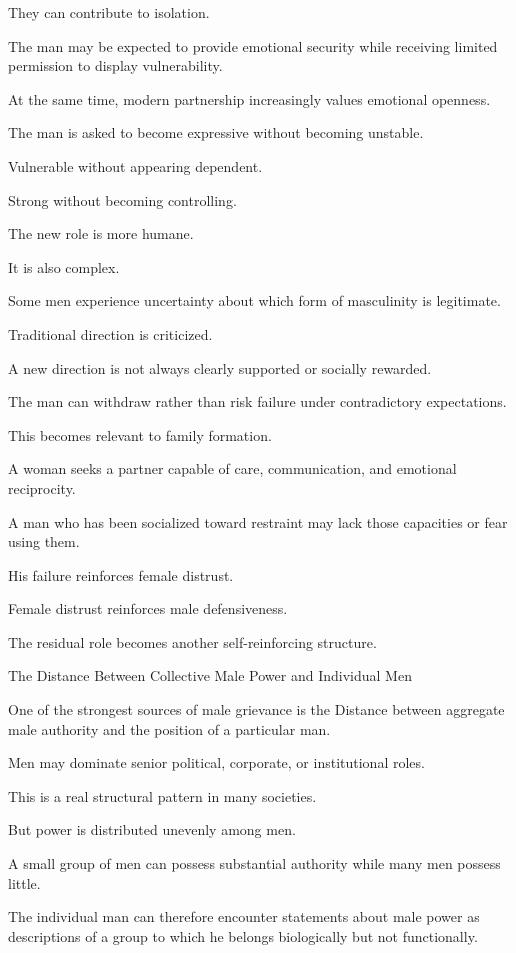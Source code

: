 They can contribute to isolation.

The man may be expected to provide emotional security while receiving limited permission to display vulnerability.

At the same time, modern partnership increasingly values emotional openness.

The man is asked to become expressive without becoming unstable.

Vulnerable without appearing dependent.

Strong without becoming controlling.

The new role is more humane.

It is also complex.

Some men experience uncertainty about which form of masculinity is legitimate.

Traditional direction is criticized.

A new direction is not always clearly supported or socially rewarded.

The man can withdraw rather than risk failure under contradictory expectations.

This becomes relevant to family formation.

A woman seeks a partner capable of care, communication, and emotional reciprocity.

A man who has been socialized toward restraint may lack those capacities or fear using them.

His failure reinforces female distrust.

Female distrust reinforces male defensiveness.

The residual role becomes another self-reinforcing structure.

The Distance Between Collective Male Power and Individual Men

One of the strongest sources of male grievance is the Distance between aggregate male authority and the position of a particular man.

Men may dominate senior political, corporate, or institutional roles.

This is a real structural pattern in many societies.

But power is distributed unevenly among men.

A small group of men can possess substantial authority while many men possess little.

The individual man can therefore encounter statements about male power as descriptions of a group to which he belongs biologically but not functionally.

